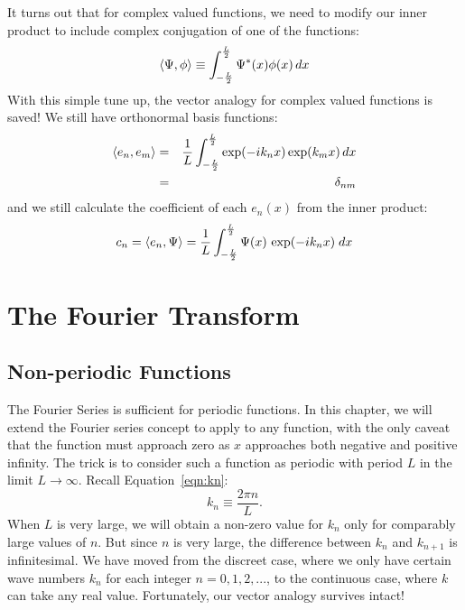 \documentclass[12pt,oneside]{book}
\begin{document}
It turns out that for complex valued functions, we need to modify our inner product to include complex conjugation of one of the functions:
\begin{equation}
\braket{\Psi, \phi} \equiv \int_{-\frac{L}{2}}^{\frac{L}{2}} \Psi^*(x) \phi(x) \, dx
\end{equation}
With this simple tune up, the vector analogy for complex valued functions is saved!   We still have orthonormal basis functions:
\begin{eqnarray}
\braket{e_n, e_m} &=& \frac{1}{L} \int_{-\frac{L}{2}}^{\frac{L}{2}}  \exp(-i k_n x) \exp(k_m x) \, dx \nonumber \\
&=& \delta_{nm} \label{eqn:exportho}
\end{eqnarray}
and we still calculate the coefficient of each $e_n(x)$ from the inner product:
\begin{equation}
c_n = \braket{e_n, \Psi} = \frac{1}{L} \int_{-\frac{L}{2}}^{\frac{L}{2}}  \Psi(x) \, \exp(-i k_n x) \; dx
\end{equation}

\chapter{The Fourier Transform}

\section{Non-periodic Functions}
The Fourier Series is sufficient for periodic functions.  In this chapter, we will extend the Fourier series concept to apply to any function, with the only caveat that the function must approach zero as $x$ approaches both negative and positive infinity.  The trick is to consider such a function as periodic with period $L$ in the limit $L \to \infty$.  Recall Equation~\ref{eqn:kn}:
\begin{equation*}
k_n \equiv \frac{2 \pi n}{L}.
\end{equation*}
When $L$ is very large, we will obtain a non-zero value for $k_n$ only for comparably large values of $n$.  But since $n$ is very large, the difference between $k_n$ and $k_{n+1}$ is infinitesimal.  We have moved from the discreet case, where we only have certain wave numbers $k_n$ for each integer $n=0,1,2,...$, to the continuous case, where $k$ can take any real value.  Fortunately, our vector analogy survives intact!
\end{document}
